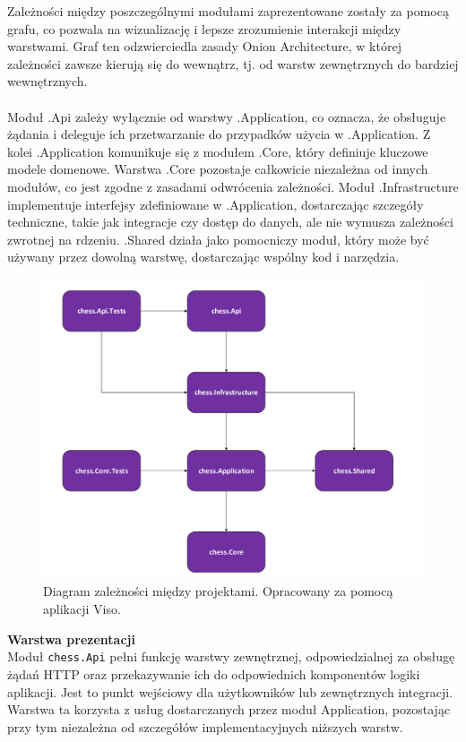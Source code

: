 \documentclass[twoside]{projektInzynierskiMS1}
\begin{document}
\newpage

\noindent
Zależności między poszczególnymi modułami zaprezentowane zostały za pomocą grafu, co pozwala na wizualizację i lepsze zrozumienie interakcji między warstwami. Graf ten odzwierciedla zasady Onion Architecture, w której zależności zawsze kierują się do wewnątrz, tj. od warstw zewnętrznych do bardziej wewnętrznych.
\\\\
Moduł .Api zależy wyłącznie od warstwy .Application, co oznacza, że obsługuje żądania i deleguje ich przetwarzanie do przypadków użycia w .Application. Z kolei .Application komunikuje się z modułem .Core, który definiuje kluczowe modele domenowe. Warstwa .Core pozostaje całkowicie niezależna od innych modułów, co jest zgodne z zasadami odwrócenia zależności. Moduł .Infrastructure implementuje interfejsy zdefiniowane w .Application, dostarczając szczegóły techniczne, takie jak integracje czy dostęp do danych, ale nie wymusza zależności zwrotnej na rdzeniu. .Shared działa jako pomocniczy moduł, który może być używany przez dowolną warstwę, dostarczając wspólny kod i narzędzia.

\vspace{0.5cm}
\begin{figure}[h!]
    \centering
    \includegraphics[width=1\textwidth]{images/diagram_dependencies.png}
    \caption{Diagram zależności między projektami. Opracowany za pomocą aplikacji Viso.}
\end{figure}

\newpage

\noindent \textbf{Warstwa prezentacji}\\
Moduł \texttt{chess.Api} pełni funkcję warstwy zewnętrznej, odpowiedzialnej za obsługę żądań HTTP oraz przekazywanie ich do odpowiednich komponentów logiki aplikacji. Jest to punkt wejściowy dla użytkowników lub zewnętrznych integracji. Warstwa ta korzysta z usług dostarczanych przez moduł Application, pozostając przy tym niezależna od szczegółów implementacyjnych niższych warstw.
\end{document}
